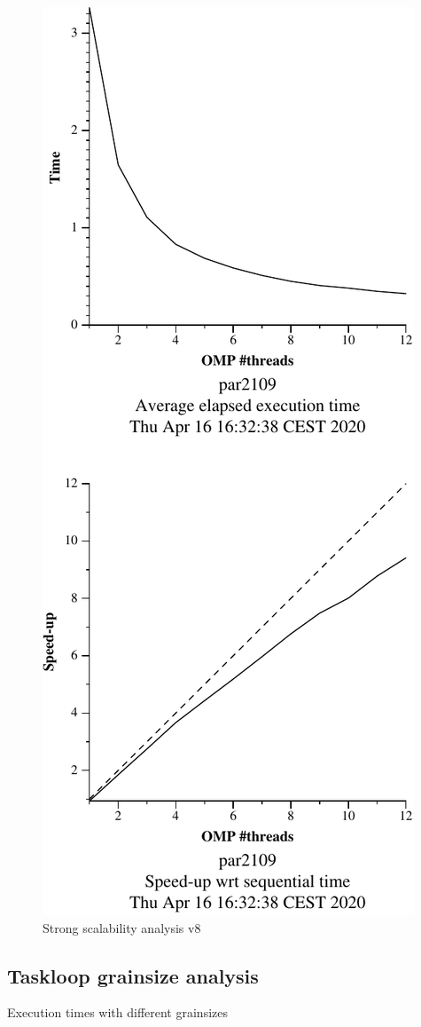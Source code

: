 \begin{figure}[H]
\begin{minipage}{0.5\textwidth}
        \includegraphics[width=0.7\linewidth]{plots/v8-crop.pdf}
        \caption{Strong scalability analysis v8}
        \label{fig:ssa_v8} 
    \end{minipage}
\end{figure}

\subsection{Taskloop grainsize analysis}

\begin{table}[H]
    \caption{Execution times with different grainsizes}%
    \label{tab:grainsize}
    \begin{center}
    
    \end{center}
\end{table}


